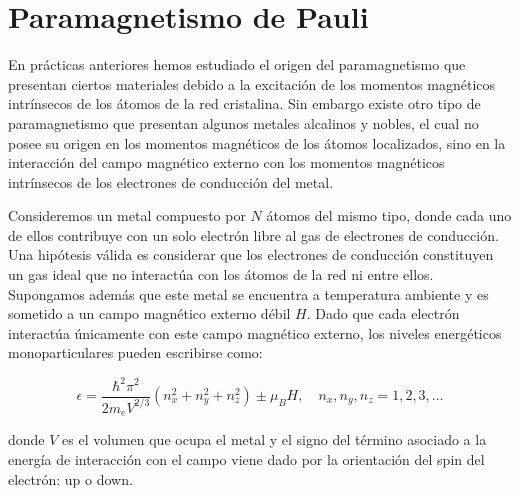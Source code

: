 \documentclass[a4paper,11pt]{article}
\begin{document}
\section{Paramagnetismo de Pauli}

En prácticas anteriores hemos estudiado el origen del paramagnetismo que 
presentan ciertos materiales debido a la excitación de los momentos 
magnéticos intrínsecos de los átomos de la red cristalina.
Sin embargo existe otro tipo de paramagnetismo que presentan algunos metales 
alcalinos y nobles, el cual no posee su origen en los momentos magnéticos de 
los átomos localizados, sino en la interacción del campo magnético externo 
con los momentos magnéticos intrínsecos de los electrones de conducción del 
metal.

Consideremos un metal compuesto por $N$ átomos del mismo tipo, donde cada uno 
de ellos contribuye con un solo electrón libre al gas de electrones de 
conducción.
Una hipótesis válida es considerar que los electrones de conducción 
constituyen un gas ideal que no interactúa con los átomos de la red ni entre 
ellos.
Supongamos además que este metal se encuentra a temperatura ambiente y es 
sometido a un campo magnético externo débil $H$.
Dado que cada electrón interactúa únicamente con este campo magnético 
externo, los niveles energéticos monoparticulares pueden escribirse como:

$$
\epsilon =
\frac{\hbar^2 \pi^2}{2m_e V^{2/3}} (n_x^2 + n_y^2 + n_z^2) \pm \mu_B H,
\quad
n_x, n_y, n_z = 1, 2, 3, \dots
$$

\noindent donde $V$ es el volumen que ocupa el metal y el signo del término 
asociado a la energía de interacción con el campo viene dado por la 
orientación del spin del electrón: up o down.
\end{document}
